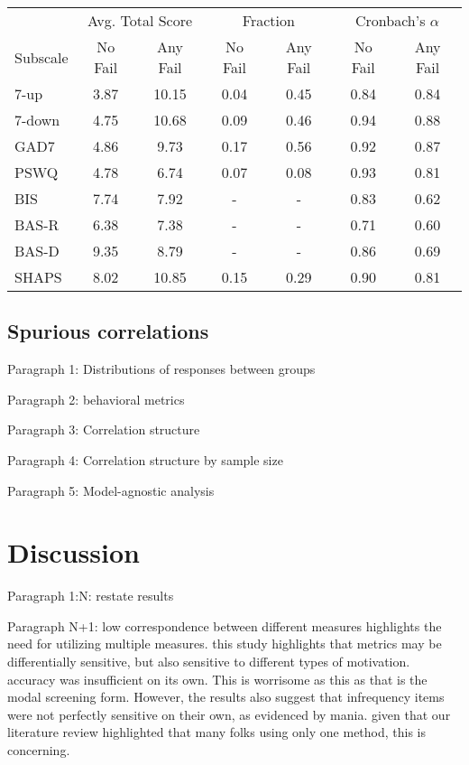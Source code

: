 \documentclass[a4paper,notitlepage,12pt]{article}
\begin{document}
\begin{table}[t]
\centering
\setlength{\tabcolsep}{6pt}
\begin{tabular}{lcccccc}
\toprule
& \multicolumn{2}{c}{Avg. Total Score} & \multicolumn{2}{c}{Fraction} & \multicolumn{2}{c}{Cronbach's $\alpha$} \\
\cmidrule(lr){2-3} \cmidrule(lr){4-5} \cmidrule(lr){6-7}
 Subscale & No Fail & Any Fail & No Fail & Any Fail & No Fail & Any Fail \\
\midrule
7-up    &  3.87 &  10.15 &  0.04 &  0.45 &  0.84 &  0.84 \\
7-down   &  4.75 &  10.68 &  0.09 &  0.46 &  0.94 &  0.88 \\
GAD7  &  4.86 &   9.73 &  0.17 &  0.56 &  0.92 &  0.87 \\
PSWQ  &  4.78 &   6.74 &  0.07 &   0.08 &  0.93 &  0.81 \\
BIS   &  7.74 &   7.92 &   - &   - &  0.83 &  0.62 \\
BAS-R &  6.38 &   7.38 &   - &   - &  0.71 &  0.60 \\
BAS-D &  9.35 &   8.79 &   - &   - &  0.86 &  0.69 \\
SHAPS &  8.02 &  10.85 &   0.15 &   0.29 &  0.90 &  0.81 \\
\bottomrule
\end{tabular}
\caption{}
\label{tab:screening}
\end{table}

\subsection{Spurious correlations}

Paragraph 1: Distributions of responses between groups

Paragraph 2: behavioral metrics

Paragraph 3: Correlation structure 

Paragraph 4: Correlation structure by sample size

Paragraph 5: Model-agnostic analysis 

\section{Discussion}

Paragraph 1:N: restate results

Paragraph N+1: low correspondence between different measures highlights the need for utilizing multiple measures. this study highlights that metrics may be differentially sensitive, but also sensitive to different types of motivation. accuracy was insufficient on its own. This is worrisome as this as that is the modal screening form. However, the results also suggest that infrequency items were not perfectly sensitive on their own, as evidenced by mania. given that our literature review highlighted that many folks using only one method, this is concerning. 
\end{document}
